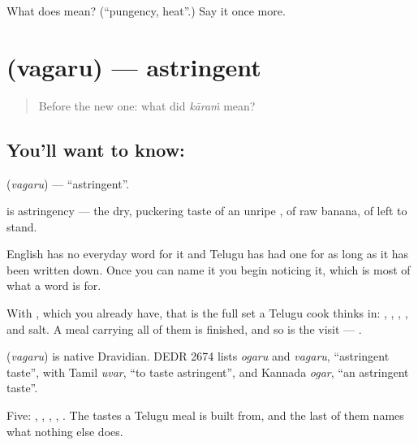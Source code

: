 \begin{tcolorbox}[breakable,colback=teal!4,colframe=teal!35!black,title={Before you move on}]
What does  mean? (\textquotedblleft{}pungency, heat\textquotedblright{}.) Say it once more.
\end{tcolorbox}
\section[\texorpdfstring{\te{వగరు} (vagaru)}{వగరు (vagaru)}]{ (vagaru) — astringent}

\label{lesson:TE-C73-astringent}



\begin{quote}
Before the new one: what did \emph{kāraṁ} mean?
\end{quote}

\subsection*{You'll want to know: }
\textbf{} (\emph{vagaru}) — \textquotedblleft{}astringent\textquotedblright{}.

 is astringency — the dry, puckering taste of an unripe , of raw banana, of  left to stand.

English has no everyday word for it and Telugu has had one for as long as it has been written down. Once you can name it you begin noticing it, which is most of what a word is for.

With , which you already have, that is the full set a Telugu cook thinks in: , , , ,  and salt. A meal carrying all of them is finished, and so is the visit — .

\begin{cousinweb}
\textbf{} (\emph{vagaru}) is native Dravidian. DEDR 2674 lists \emph{ogaru} and \emph{vagaru}, \textquotedblleft{}astringent taste\textquotedblright{}, with Tamil \emph{uvar}, \textquotedblleft{}to taste astringent\textquotedblright{}, and Kannada \emph{ogar}, \textquotedblleft{}an astringent taste\textquotedblright{}.
\end{cousinweb}

\begin{grammarlens}[title={What you've built}]
Five: , , , , . The tastes a Telugu meal is built from, and the last of them names what nothing else does.
\end{grammarlens}

